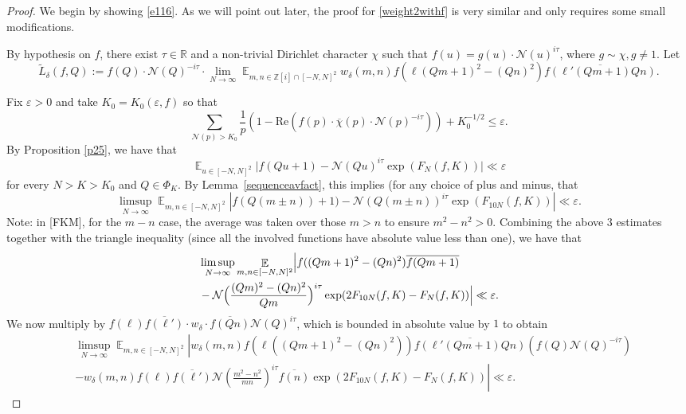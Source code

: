 \documentclass[11pt]{amsart}
\theoremstyle{definition}
\DeclareMathOperator*{\E}{\mathbb{E}}
\newcommand{\NN}{{\mathcal N}}
\newcommand{\R}{{\mathbb R}}
\newcommand{\Z}{{\mathbb Z}}
\begin{document}
\begin{proof}
We begin by showing \eqref{e116}. As we will point out later, the proof for \eqref{weight2withf} is very similar and only requires some small modifications.

By hypothesis on $f$, there exist $\tau \in \R$ and a non-trivial Dirichlet character $\chi$ such that $f(u)=g(u)\cdot \NN(u)^{i\tau}$, where $g\sim \chi, g\neq 1$. Let
    $$\tilde{L}_{\delta}(f,Q):=f(Q)\cdot \NN(Q)^{-i\tau}\cdot\lim_{N \to \infty} \E_{m,n\in \Z[i] \cap [-N,N]^2} w_{\delta}(m,n)f(\ell(Qm+1)^2-(Qn)^2)\overline{f(\ell'(Qm+1)Qn)}.$$

Fix $\varepsilon>0$ and take $K_{0}=K_{0}(\varepsilon,f)$ so that 
$$\sum_{\NN(p)>K_{0}}\frac{1}{p}(1-\text{Re}(f(p)\cdot \overline{\chi}(p)\cdot \NN(p)^{-i\tau}))+K_{0}^{-1/2}\leq \varepsilon.$$
By Proposition \ref{p25}, we have that
$$\E_{u\in [-N,N]^{2}}\vert f(Qu+1)-\NN(Qu)^{i\tau}\exp(F_{N}(f,K))\vert\ll\varepsilon$$
for every $N>K>K_{0}$ and $Q\in\Phi_{K}$. By Lemma~\ref{sequenceavfact}, this implies (for any choice of plus and minus, that
\[
\limsup_{N\to\infty}\E_{m,n\in [-N,N]^{2}}\left| f(Q(m\pm n))+1)-\NN(Q(m\pm n))^{i\tau}\exp(F_{10N}(f,K))\right|\ll\varepsilon.
\]
{\color{red} Note: in [FKM], for the $m-n$ case, the average was taken over those $m>n$ to ensure $m^{2}-n^{2}>0$.}
Combining the above 3 estimates together with the triangle inequality (since all the involved functions have absolute value less than one), we have that
 \begin{equation} 
    \begin{split}
       &\limsup_{N\to\infty}\E_{m,n\in [-N,N]^{2}}\Bigl\vert f((Qm+1)^2-(Qn)^2)\overline{f(Qm+1)}
       \\&-\NN\Bigl(\frac{(Qm)^2-(Qn)^2}{Qm}\Bigr)^{i\tau}\exp(2F_{10N}(f,K)-F_{N}(f,K))\Bigr\vert\ll\varepsilon. 
    \end{split}
\end{equation}
We now multiply by $f(\ell)\overline{f(\ell')}\cdot w_{\delta} \cdot \overline{f(Qn)}\NN(Q)^{i\tau}$, which is bounded in absolute value by $1$ to obtain
 \begin{equation} 
    \begin{split}
       &\limsup_{N\to\infty}\E_{m,n\in [-N,N]^{2}}\left| w_{\delta}(m,n)f(\ell((Qm+1)^2-(Qn)^2))\overline{f(\ell'(Qm+1)Qn)}(f(Q)\NN(Q)^{-i\tau})\right.
       \\&-w_{\delta}(m,n)f(\ell)\overline{f(\ell')}\left.\NN\left(\frac{m^2-n^2}{mn}\right)^{i\tau}\overline{f(n)}\exp(2F_{10N}(f,K)-F_{N}(f,K))\right|\ll\varepsilon. 

\end{split}
\end{equation}
\end{proof}
\end{document}
